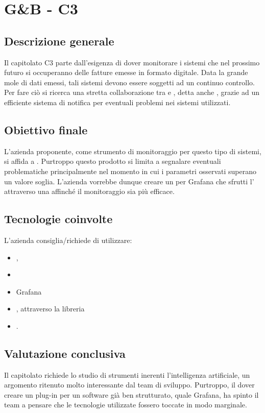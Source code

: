 \section{G\&B - C3} \label{c3}
    \subsection{Descrizione generale}
    Il capitolato C3 parte dall'esigenza di dover monitorare i sistemi che nel prossimo futuro si occuperanno delle fatture emesse in formato digitale.
    Data la grande mole di dati emessi, tali sistemi devono essere soggetti ad un continuo controllo. Per fare ciò si ricerca una stretta collaborazione
    tra  e , detta anche , grazie ad un efficiente sistema di notifica per eventuali problemi nei sistemi utilizzati.

    \subsection{Obiettivo finale}
    L'azienda proponente, come strumento di monitoraggio per questo tipo di sistemi, si affida a . Purtroppo questo prodotto si limita a
    segnalare eventuali problematiche principalmente nel momento in cui i parametri osservati superano un valore soglia. L'azienda vorrebbe dunque creare un 
    per Grafana che sfrutti l' attraverso una  affinché il monitoraggio sia più efficace.

    \subsection{Tecnologie coinvolte}
    L'azienda consiglia/richiede di utilizzare:
    \begin{itemize}
    	\item {}, 
    	\item {}
    	\item Grafana
    	\item {}, attraverso la libreria 
    	\item {}.
    \end{itemize}

    \subsection{Valutazione conclusiva}
    Il capitolato richiede lo studio di strumenti inerenti l'intelligenza artificiale, un argomento ritenuto molto interessante dal team di sviluppo.
    Purtroppo, il dover creare un plug-in per un software già ben strutturato, quale Grafana, ha spinto il team a pensare che le tecnologie utilizzate fossero
    toccate in modo marginale.

